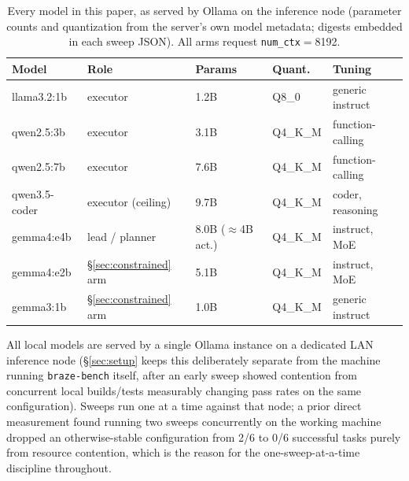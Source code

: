 \documentclass[smallcondensed,natbib]{svjour3}
\begin{document}
\begin{table}[t]
\centering\small
\caption{Every model in this paper, as served by Ollama on the
inference node (parameter counts and quantization from the server's
own model metadata; digests embedded in each sweep JSON). All arms
request \texttt{num\_ctx}${}={}$8192.}
\label{tab:models}
\begin{tabular}{lllll}
\toprule
Model & Role & Params & Quant. & Tuning \\
\midrule
llama3.2:1b & executor & 1.2B & Q8\_0 & generic instruct \\
qwen2.5:3b & executor & 3.1B & Q4\_K\_M & function-calling \\
qwen2.5:7b & executor & 7.6B & Q4\_K\_M & function-calling \\
qwen3.5-coder & executor (ceiling) & 9.7B & Q4\_K\_M & coder, reasoning \\
gemma4:e4b & lead / planner & 8.0B ($\approx$4B act.) & Q4\_K\_M & instruct, MoE \\
gemma4:e2b & \S\ref{sec:constrained} arm & 5.1B & Q4\_K\_M & instruct, MoE \\
gemma3:1b & \S\ref{sec:constrained} arm & 1.0B & Q4\_K\_M & generic instruct \\
\bottomrule
\end{tabular}
\end{table} All local models are served by a single Ollama instance on a
dedicated LAN inference node (\S\ref{sec:setup} keeps this deliberately
separate from the machine running \texttt{braze-bench} itself, after an
early sweep showed contention from concurrent local builds/tests
measurably changing pass rates on the same configuration). Sweeps run
one at a time against that node; a prior direct measurement found
running two sweeps concurrently on the working machine dropped an
otherwise-stable configuration from 2/6 to 0/6 successful tasks purely
from resource contention, which is the reason for the one-sweep-at-a-time
discipline throughout.
\end{document}
